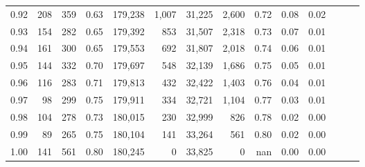 \begin{tabular}{rrrrrrrrrrrrrr}
0.92 &    208 &  359 &  0.63 &  179,238 &    1,007 &  31,225 &   2,600 &  0.72 &  0.08 &      0.02 \\
0.93 &    154 &  282 &  0.65 &  179,392 &      853 &  31,507 &   2,318 &  0.73 &  0.07 &      0.01 \\
0.94 &    161 &  300 &  0.65 &  179,553 &      692 &  31,807 &   2,018 &  0.74 &  0.06 &      0.01 \\
0.95 &    144 &  332 &  0.70 &  179,697 &      548 &  32,139 &   1,686 &  0.75 &  0.05 &      0.01 \\
0.96 &    116 &  283 &  0.71 &  179,813 &      432 &  32,422 &   1,403 &  0.76 &  0.04 &      0.01 \\
0.97 &     98 &  299 &  0.75 &  179,911 &      334 &  32,721 &   1,104 &  0.77 &  0.03 &      0.01 \\
0.98 &    104 &  278 &  0.73 &  180,015 &      230 &  32,999 &     826 &  0.78 &  0.02 &      0.00 \\
0.99 &     89 &  265 &  0.75 &  180,104 &      141 &  33,264 &     561 &  0.80 &  0.02 &      0.00 \\
1.00 &    141 &  561 &  0.80 &  180,245 &        0 &  33,825 &       0 &   nan &  0.00 &      0.00 \\
\bottomrule
\end{tabular}
